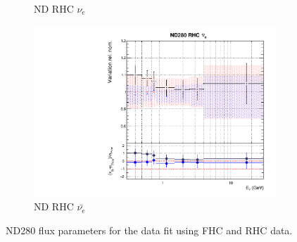 \begin{figure}[t]
\begin{subfigure}{0.45\textwidth}
  \caption{ND RHC $\nu_{e}$}
\end{subfigure}
\vspace{15mm}
\begin{subfigure}{0.45\textwidth}
  \centering
  \includegraphics[width=0.75\linewidth]{figs/rhcmpdat28flux_7}
  \caption{ND RHC $\bar{\nu_e}$}
\end{subfigure}
\caption{ND280 flux parameters for the data fit using FHC and RHC data.}
\label{fig:rhcmpidat28ND}
\end{figure}

